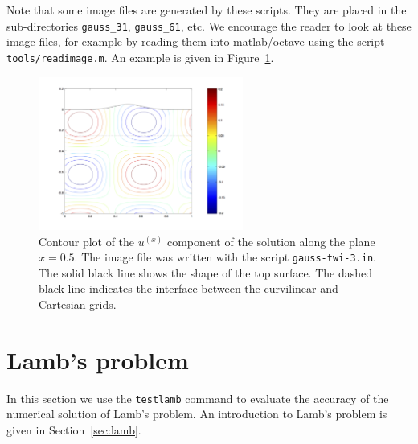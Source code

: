 \documentclass[11pt]{report}
\begin{document}
Note that some image files are generated by these scripts. They are placed in the sub-directories
\verb+gauss_31+, \verb+gauss_61+, etc. We encourage the reader to look at these image files, for
example by reading them into matlab/octave using the script \verb+tools/readimage.m+. An example is
given in Figure~\ref{fig:ux}.
\begin{figure}
\begin{center}
\includegraphics[width=0.6\textwidth]{ux.png}
\caption{Contour plot of the $u^{(x)}$ component of the solution along the plane $x=0.5$. The image
  file was written with the script {\tt gauss-twi-3.in}. The solid black line shows the shape of the
  top surface. The dashed black line indicates the interface between the curvilinear and Cartesian
  grids.}
\label{fig:ux}
\end{center}
\end{figure}


\section{Lamb's problem}\label{sec:testlamb}

In this section we use the {\tt testlamb} command to evaluate the accuracy of the numerical
solution of Lamb's problem. An introduction to Lamb's problem is given in Section~\ref{sec:lamb}.
\end{document}
